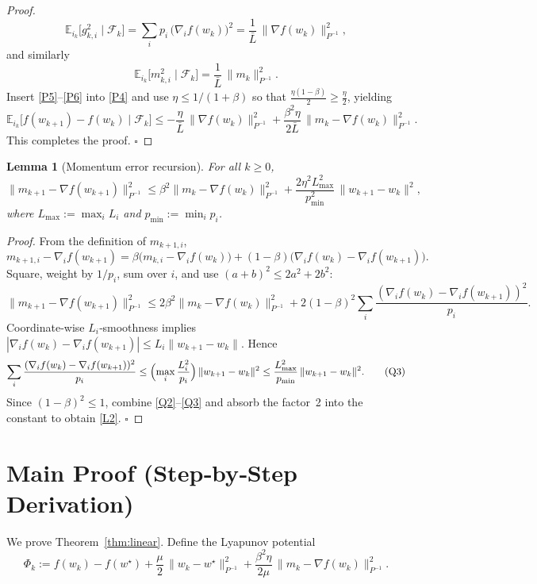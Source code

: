 \documentclass{article}
\newtheorem{lemma}{Lemma}
\newcommand{\E}{\mathbb{E}}
\begin{document}
\begin{proof}
\[
\E_{i_k}\!\bigl[g_{k,i}^{2}\mid\mathcal{F}_k\bigr]
= \sum_{i}p_i\,\bigl(\nabla_i f(w_k)\bigr)^{2}
= \frac{1}{\bar L}\,\|\nabla f(w_k)\|_{P^{-1}}^{2},
\tag{P5}
\]
and similarly
\[
\E_{i_k}\!\bigl[m_{k,i}^{2}\mid\mathcal{F}_k\bigr]
= \frac{1}{\bar L}\,\|m_{k}\|_{P^{-1}}^{2}.
\tag{P6}
\]
Insert \eqref{P5}–\eqref{P6} into \eqref{P4} and use $\eta\le 1/(1+\beta)$ so that
$\frac{\eta(1-\beta)}{2}\ge\frac{\eta}{2}$, yielding
\[
\E_{i_k}\!\bigl[f(w_{k+1})-f(w_k)\mid\mathcal{F}_k\bigr]
\le -\frac{\eta}{\bar L}\,\|\nabla f(w_k)\|_{P^{-1}}^{2}
   +\frac{\beta^{2}\eta}{2\bar L}\,
      \|m_{k}-\nabla f(w_k)\|_{P^{-1}}^{2}.
\tag{L1}
\]
This completes the proof. \hfill $\square$
\end{proof}

\begin{lemma}[Momentum error recursion]\label{lem:momentum}
For all $k\ge0$,
\[
\|m_{k+1}-\nabla f(w_{k+1})\|_{P^{-1}}^{2}
\le \beta^{2}\|m_{k}-\nabla f(w_{k})\|_{P^{-1}}^{2}
      +\frac{2\eta^{2}L_{\max}^{2}}{p_{\min}^{2}}\,
        \|w_{k+1}-w_{k}\|^{2},
\tag{L2}
\]
where $L_{\max}:=\max_i L_i$ and $p_{\min}:=\min_i p_i$.
\end{lemma}
\begin{proof}
From the definition of $m_{k+1,i}$,
\[
m_{k+1,i}-\nabla_i f(w_{k+1})
= \beta\bigl(m_{k,i}-\nabla_i f(w_{k})\bigr)
   + (1-\beta)\bigl(\nabla_i f(w_k)-\nabla_i f(w_{k+1})\bigr).
\tag{Q1}
\]
Square, weight by $1/p_i$, sum over $i$, and use $(a+b)^2\le2a^2+2b^2$:
\[
\|m_{k+1}-\nabla f(w_{k+1})\|_{P^{-1}}^{2}
\le 2\beta^{2}\|m_{k}-\nabla f(w_{k})\|_{P^{-1}}^{2}
   +2(1-\beta)^{2}\!\sum_i\frac{(\nabla_i f(w_k)-\nabla_i f(w_{k+1}))^{2}}{p_i}.
\tag{Q2}
\]
Coordinate‑wise $L_i$‑smoothness implies
$|\nabla_i f(w_k)-\nabla_i f(w_{k+1})|
   \le L_i\|w_{k+1}-w_k\|$.
Hence
\[
\sum_i\frac{(\nabla_i f(w_k)-\nabla_i f(w_{k+1}))^{2}}{p_i}
\le \Bigl(\max_i\frac{L_i^{2}}{p_i}\Bigr)\,
      \|w_{k+1}-w_k\|^{2}
\le \frac{L_{\max}^{2}}{p_{\min}}\,\|w_{k+1}-w_k\|^{2}.
\tag{Q3}
\]
Since $(1-\beta)^{2}\le1$, combine \eqref{Q2}–\eqref{Q3} and absorb the factor~2
into the constant to obtain \eqref{L2}. \hfill $\square$
\end{proof}

\section*{Main Proof (Step‑by‑Step Derivation)}
We prove Theorem~\ref{thm:linear}.  Define the Lyapunov potential
\[
\Phi_k:= f(w_k)-f(w^\star)
          +\frac{\mu}{2}\,\|w_k-w^\star\|_{P^{-1}}^{2}
          +\frac{\beta^{2}\eta}{2\mu}\,
            \|m_k-\nabla f(w_k)\|_{P^{-1}}^{2}.
\tag{V1}
\]
\end{document}
